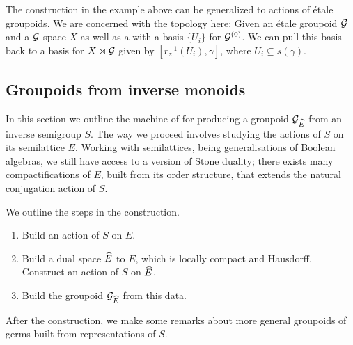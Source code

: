 \begin{example}
The construction in the example above can be generalized to actions of \'etale groupoids. We are concerned with the topology here: Given an \'etale groupoid $\mathcal{G}$ and a $\mathcal{G}$-space $X$ as well as a with a basis $\lbrace U_{i} \rbrace$ for $\mathcal{G}^{(0)}$. We can pull this basis back to a basis for $X \rtimes \mathcal{G}$ given by $[r_{z}^{-1}(U_{i}),\gamma]$, where $U_{i} \subseteq s(\gamma)$.
\end{example}

\subsection{Groupoids from inverse monoids}\label{sect:semitogrpoid}
In this section we outline the machine of \cite{MR1724106,MR2419901} for producing a groupoid $\mathcal{G}_{\widehat{E}}$ from an inverse semigroup $S$. The way we proceed involves studying the actions of $S$ on its semilattice $E$. Working with semilattices, being generalisations of Boolean algebras, we still have access to a version of Stone duality; there exists many compactifications of $E$, built from its order structure, that extends the natural conjugation action of $S$. 

We outline the steps in the construction.
\begin{enumerate}
\item Build an action of $S$ on $E$.
\item Build a dual space $\widehat{E}$ to $E$, which is locally compact and Hausdorff. Construct an action of $S$ on $\widehat{E}$.
\item Build the groupoid $\mathcal{G}_{\widehat{E}}$ from this data.
\end{enumerate}
After the construction, we make some remarks about more general groupoids of germs built from representations of $S$.

